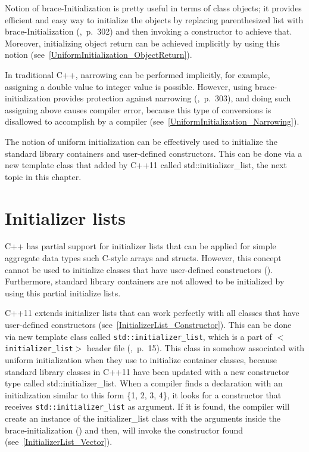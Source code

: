 \documentclass[11pt]{report}
\begin{document}
Notion of brace-Initialization is pretty useful in terms of class objects; it provides efficient and easy way to initialize the objects by replacing parenthesized list with brace-Initialization (\cite{Gregorie:professionalcpp},~p.~302) and then invoking a constructor to achieve that. Moreover, initializing object return can be achieved implicitly by using this notion (see~\ref{UniformInitialization_ObjectReturn}).

In traditional C++, narrowing can be performed implicitly, for example, assigning a double value to integer value is possible. However, using brace-initialization provides protection against narrowing (\cite{Gregorie:professionalcpp},~p.~303), and doing such assigning above causes compiler error, because this type of conversions is disallowed to accomplish by a compiler (see~\ref{UniformInitialization_Narrowing}).

The notion of uniform initialization can be effectively used to initialize the standard library containers and user-defined constructors. This can be done via a new template class that added by C++11 called std::initializer\_list, the next topic in this chapter.

\section{Initializer lists}
\label{section: Initializer lists}
C++ has partial support for initializer lists that can be applied for simple aggregate data types such C-style arrays and structs. However, this concept cannot be used to initialize classes that have user-defined constructors (\cite{Stroustrup:2012:Cpp11}). Furthermore, standard library containers are not allowed to be initialized by using this partial initialize lists.

C++11 extends initializer lists that can work perfectly with all classes that have user-defined constructors (see~\ref{InitializerList_Constructor}). This can be done via new template class called \texttt{std::initializer\_list}, which is a part of \texttt{$<$initializer\_list$>$} header file (\cite{Reddy:2011:API},~p.~15). This class in somehow associated with uniform initialization when they use to initialize container classes, because standard library classes in C++11 have been updated with a new constructor type called std::initializer\_list. When a compiler finds a declaration with an initialization similar to this form \{1, 2, 3, 4\}, it looks for a constructor that receives \texttt{std::initializer\_list} as argument. If it is found, the compiler will create an instance of the initializer\_list class with the arguments inside the brace-initialization (\cite{Stroustrup:2012:Cpp11}) and then, will invoke the constructor found (see~\ref{InitializerList_Vector}). 
\end{document}
